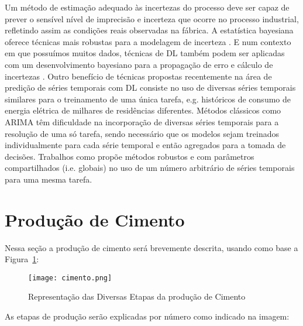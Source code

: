 Um método de estimação adequado às incertezas do processo deve ser capaz de prever o sensível nível de imprecisão e
incerteza que ocorre no processo industrial,
refletindo assim as condições reais observadas na fábrica. A estatística bayesiana oferece técnicas
mais robustas para a modelagem de incerteza \citep{bayesml}. E num contexto em
que possuímos muitos dados, técnicas de DL também podem ser aplicadas com um
desenvolvimento bayesiano para a propagação de erro e cálculo de incertezas
\citep{ubertime,Gal2016Uncertainty}. Outro benefício de técnicas propostas
recentemente na área de predição de séries temporais com DL consiste no uso de diversas séries temporais similares para o treinamento de uma
única tarefa, e.g. históricos de consumo de energia elétrica de milhares
de residências diferentes. Métodos clássicos como ARIMA têm 
dificuldade na incorporação de diversas séries temporais para a resolução de uma
só tarefa, sendo necessário que os modelos sejam treinados individualmente para
cada série temporal e então agregados para a tomada de decisões. Trabalhos como
\citep{ubertime,deepar,deepfactors} propõe métodos robustos e com parâmetros
compartilhados (i.e. globais) no uso de um número arbitrário de séries temporais
para uma mesma tarefa.



\section{Produção de Cimento}
\label{sec:producao}

Nessa seção a produção de cimento será brevemente descrita, usando como base a Figura~\ref{fig:cimento}:  

\begin{figure}[H]
\centering
\texttt{[image: cimento.png]}
\caption{Representação das Diversas Etapas da produção de Cimento \citep{cementroadmap}}
\label{fig:cimento}
\end{figure}


As etapas de produção serão explicadas por número como indicado na imagem: \\

